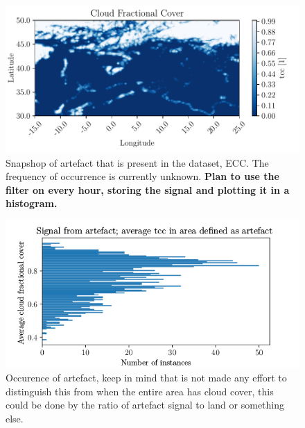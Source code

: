\begin{figure}
    \centering
    \includegraphics{python_figs/example_artefact.pdf}
    \caption[Artefact in European Cloud Cover dataset.]{Snapshop of artefact that is present in the dataset, ECC. The frequency of occurrence is currently unknown. \textbf{Plan to use the filter on every hour, storing the signal and plotting it in a histogram.}}
    \label{fig:example_artefact}
\end{figure}

\begin{figure}
    \centering
    \includegraphics{python_figs/signal_artefact.png}
    \caption{Occurence of artefact, keep in mind that is not made any effort to distinguish this from when the entire area has cloud cover, this could be done by the ratio of artefact signal to land or something else. }
    \label{fig:signal_artefact}
\end{figure}

